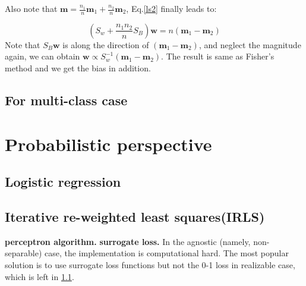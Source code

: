\documentclass{article}
\begin{document}
Also note that $\mathbf{m}=\frac{n_1}{n}\mathbf{m}_1 + \frac{n_2}{n} \mathbf{m}_2$, Eq.\ref{ls2} finally leads to:

	$$(S_w + \frac{n_1 n_2}{n} S_B) \mathbf{w} = n(\mathbf{m}_1 - \mathbf{m}_2)$$
Note that $S_B \mathbf{w}$ is along the direction of $(\mathbf{m}_1 - \mathbf{m}_2)$, and neglect the magnitude again, we can obtain $\mathbf{w} \propto S_w^{-1} (\mathbf{m}_1 - \mathbf{m}_2)$. The result is same as Fisher's method and we get the bias in addition.

\subsection{For multi-class case}		
		
		
		 
\section{Probabilistic perspective}
	
	\subsection{Logistic regression}
	\label{sec-lr}
	
	\subsection{Iterative re-weighted least squares(IRLS)}
	
		 \textbf{perceptron algorithm.}
	 \textbf{surrogate loss.} In the agnostic (namely, non-separable) case, the implementation is computational hard. The most popular solution is to use surrogate loss functions but not the 0-1 loss in realizable case, which is left in \ref{sec-lr}.
	
\end{document}
